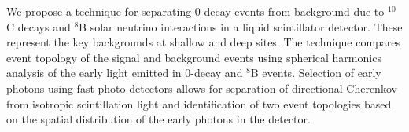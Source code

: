 We propose a technique for separating 0{\nbb}-decay events from
background due to $^10$C decays and $^8$B solar neutrino interactions in a liquid
scintillator detector. These represent the key backgrounds at shallow and deep sites. The technique compares event topology of the
signal and background events using spherical harmonics analysis of the
early light emitted in 0{\nbb}-decay and $^8$B events. Selection of
early photons using fast photo-detectors allows for separation of
directional Cherenkov from isotropic scintillation light and
identification of two event topologies based on the spatial
distribution of the early photons in the detector.
